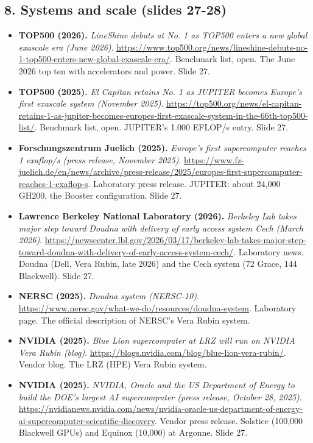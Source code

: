 \subsection*{8. Systems and scale (slides 27-28)}
\begin{itemize}[leftmargin=1.2em,itemsep=3pt]\sloppy
\item \textbf{TOP500 (2026).} \textit{LineShine debuts at No. 1 as TOP500 enters a new global exascale era (June 2026)}. \url{https://www.top500.org/news/lineshine-debuts-no-1-top500-enters-new-global-exascale-era/}. Benchmark list, open. The June 2026 top ten with accelerators and power. Slide 27.
\item \textbf{TOP500 (2025).} \textit{El Capitan retains No. 1 as JUPITER becomes Europe's first exascale system (November 2025)}. \url{https://top500.org/news/el-capitan-retains-1-as-jupiter-becomes-europes-first-exascale-system-in-the-66th-top500-list/}. Benchmark list, open. JUPITER's 1.000 EFLOP/s entry. Slide 27.
\item \textbf{Forschungszentrum Juelich (2025).} \textit{Europe's first supercomputer reaches 1 exaflop/s (press release, November 2025)}. \url{https://www.fz-juelich.de/en/news/archive/press-release/2025/europes-first-supercomputer-reaches-1-exaflop-s}. Laboratory press release. JUPITER: about 24,000 GH200, the Booster configuration. Slide 27.
\item \textbf{Lawrence Berkeley National Laboratory (2026).} \textit{Berkeley Lab takes major step toward Doudna with delivery of early access system Cech (March 2026)}. \url{https://newscenter.lbl.gov/2026/03/17/berkeley-lab-takes-major-step-toward-doudna-with-delivery-of-early-access-system-cech/}. Laboratory news. Doudna (Dell, Vera Rubin, late 2026) and the Cech system (72 Grace, 144 Blackwell). Slide 27.
\item \textbf{NERSC (2025).} \textit{Doudna system (NERSC-10)}. \url{https://www.nersc.gov/what-we-do/resources/doudna-system}. Laboratory page. The official description of NERSC's Vera Rubin system.
\item \textbf{NVIDIA (2025).} \textit{Blue Lion supercomputer at LRZ will run on NVIDIA Vera Rubin (blog)}. \url{https://blogs.nvidia.com/blog/blue-lion-vera-rubin/}. Vendor blog. The LRZ (HPE) Vera Rubin system.
\item \textbf{NVIDIA (2025).} \textit{NVIDIA, Oracle and the US Department of Energy to build the DOE's largest AI supercomputer (press release, October 28, 2025)}. \url{https://nvidianews.nvidia.com/news/nvidia-oracle-us-department-of-energy-ai-supercomputer-scientific-discovery}. Vendor press release. Solstice (100,000 Blackwell GPUs) and Equinox (10,000) at Argonne. Slide 27.

\end{itemize}

